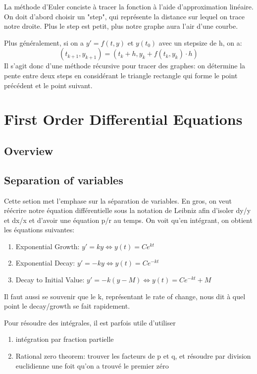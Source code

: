 \documentclass{article}
\begin{document}
La méthode d'Euler conciste à tracer la fonction à l'aide d'approximation
linéaire. On doit d'abord choisir un "step", qui représente la distance
sur lequel on trace notre droite. Plus le step est petit, plus notre graphe
aura l'air d'une courbe.

Plus généralement, si on a $ y' = f(t,y)$ et $ y(t_0)$ avec un stepsize
de h, on a:
$$ (t_{k+1}, y_{k+1}) = (t_k + h, y_k + f(t_k, y_k) \cdot h) $$
Il s'agit donc d'une méthode récursive pour tracer des graphes:
on détermine la pente entre deux steps en considérant le triangle
rectangle qui forme le point précédent et le point suivant.

\pagebreak
\section{First Order Differential Equations}
\subsection*{Overview}

\subsection{Separation of variables}

Cette setion met l'emphase sur la séparation de variables. En gros, on
veut réécrire notre équation différentielle sous la notation de Leibniz
afin d'isoler dy/y et dx/x et d'avoir une équation p/r au temps. On voit
qu'en intégrant, on obtient les équations suivantes:
\begin{enumerate}
    \item Exponential Growth: $ y' = ky \Longleftrightarrow y(t) = C e^{kt} $
    \item Exponential Decay: $ y' = -ky \Longleftrightarrow y(t) = C e^{-kt} $
    \item Decay to Initial Value: $ y' = -k (y-M) \Longleftrightarrow
	y(t) = C e^{-kt} + M $
\end{enumerate}

Il faut aussi se souvenir que le k, représentant le rate of change, nous
dit à quel point le decay/growth se fait rapidement.

\begin{remark}
    Pour résoudre des intégrales, il est parfois utile d'utiliser
    \begin{enumerate}
        \item intégration par fraction partielle
	\item Rational zero theorem: trouver les facteurs de p et q, et
	    résoudre par division euclidienne une foit qu'on a trouvé le
	    premier zéro
    \end{enumerate}
\end{remark}
\end{document}
